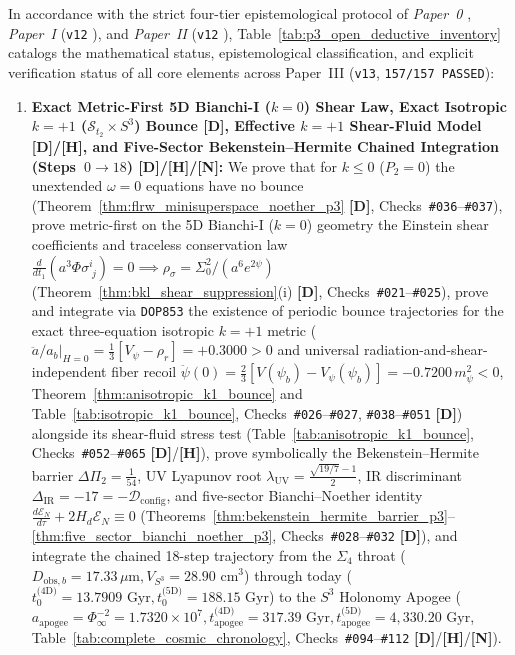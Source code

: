 \documentclass[11pt,a4paper]{article}
\newcommand{\catD}{\textbf{\textcolor{blue!75!black}{[D]}}}
\newcommand{\catH}{\textbf{\textcolor{orange!85!black}{[H]}}}
\newcommand{\catN}{\textbf{\textcolor{teal!75!black}{[N]}}}
\theoremstyle{plain}
\theoremstyle{definition}
\theoremstyle{remark}
\numberwithin{equation}{section}
\begin{document}
In accordance with the strict four-tier epistemological protocol of \textit{Paper~0} \cite{jimenez2026_p0}, \textit{Paper~I} (\texttt{v12} \cite{jimenez2026a}), and \textit{Paper~II} (\texttt{v12} \cite{jimenez2026b}), Table~\ref{tab:p3_open_deductive_inventory} catalogs the mathematical status, epistemological classification, and explicit verification status of all core elements across Paper~III (\texttt{v13}, \texttt{157/157 PASSED}):
\begin{enumerate}
  \item \textbf{Exact Metric-First 5D Bianchi-I ($k = 0$) Shear Law, Exact Isotropic $k = +1$ ($\mathcal{S}_{t_2} \times S^3$) Bounce \catD, Effective $k = +1$ Shear-Fluid Model \catD/\catH, and Five-Sector Bekenstein--Hermite Chained Integration (Steps~$0 \to 18$) \catD/\catH/\catN:} We prove that for $k \le 0$ ($P_2 = 0$) the unextended $\omega = 0$ equations have no bounce (Theorem~\ref{thm:flrw_minisuperspace_noether_p3} \catD, Checks~\texttt{\#036}--\texttt{\#037}), prove metric-first on the 5D Bianchi-I ($k = 0$) geometry the Einstein shear coefficients and traceless conservation law $\frac{d}{dt_1}(a^3\Phi\sigma^i_{\;j}) = 0 \implies \rho_{\sigma} = \Sigma_0^2/(a^6 e^{2\psi})$ (Theorem~\ref{thm:bkl_shear_suppression}(i) \catD, Checks~\texttt{\#021}--\texttt{\#025}), prove and integrate via \texttt{DOP853} the existence of periodic bounce trajectories for the exact three-equation isotropic $k = +1$ metric ($\ddot{a}/a_b|_{H=0} = \frac{1}{3}[V_{\psi} - \rho_r] = +0.3000 > 0$ and universal radiation-and-shear-independent fiber recoil $\ddot{\psi}(0) = \frac{2}{3}[V(\psi_b) - V_{\psi}(\psi_b)] = -0.7200\,m_{\psi}^2 < 0$, Theorem~\ref{thm:anisotropic_k1_bounce} and Table~\ref{tab:isotropic_k1_bounce}, Checks~\texttt{\#026}--\texttt{\#027}, \texttt{\#038}--\texttt{\#051} \catD) alongside its shear-fluid stress test (Table~\ref{tab:anisotropic_k1_bounce}, Checks~\texttt{\#052}--\texttt{\#065} \catD/\catH), prove symbolically the Bekenstein--Hermite barrier $\Delta\Pi_2 = \frac{1}{54}$, UV Lyapunov root $\lambda_{\text{UV}} = \frac{\sqrt{19/7}-1}{2}$, IR discriminant $\Delta_{\text{IR}} = -17 = -\mathcal{D}_{\text{config}}$, and five-sector Bianchi--Noether identity $\frac{d\mathcal{E}_N}{d\tau} + 2H_d\mathcal{E}_N \equiv 0$ (Theorems~\ref{thm:bekenstein_hermite_barrier_p3}--\ref{thm:five_sector_bianchi_noether_p3}, Checks~\texttt{\#028}--\texttt{\#032} \catD), and integrate the chained 18-step trajectory from the $\Sigma_4$ throat ($D_{\text{obs},b} = 17.33\,\mu\text{m}, V_{S^3} = 28.90\text{ cm}^3$) through today ($t_0^{\text{(4D)}} = 13.7909\text{ Gyr}, t_0^{\text{(5D)}} = 188.15\text{ Gyr}$) to the $S^3$ Holonomy Apogee ($a_{\text{apogee}} = \Phi_{\infty}^{-2} = 1.7320\times 10^7, t_{\text{apogee}}^{\text{(4D)}} = 317.39\text{ Gyr}, t_{\text{apogee}}^{\text{(5D)}} = 4{,}330.20\text{ Gyr}$, Table~\ref{tab:complete_cosmic_chronology}, Checks~\texttt{\#094}--\texttt{\#112} \catD/\catH/\catN).

\end{enumerate}
\end{document}
